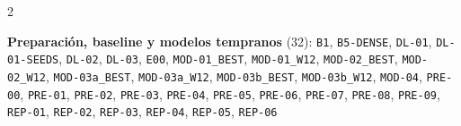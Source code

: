 \begin{multicols}{2}
\raggedright
\scriptsize
\noindent\textbf{Preparación, baseline y modelos tempranos} (32): \texttt{B1}, \texttt{B5-\allowbreak{}DENSE}, \texttt{DL-\allowbreak{}01}, \texttt{DL-\allowbreak{}01-\allowbreak{}SEEDS}, \texttt{DL-\allowbreak{}02}, \texttt{DL-\allowbreak{}03}, \texttt{E00}, \texttt{MOD-\allowbreak{}01\_\allowbreak{}BEST}, \texttt{MOD-\allowbreak{}01\_\allowbreak{}W12}, \texttt{MOD-\allowbreak{}02\_\allowbreak{}BEST}, \texttt{MOD-\allowbreak{}02\_\allowbreak{}W12}, \texttt{MOD-\allowbreak{}03a\_\allowbreak{}BEST}, \texttt{MOD-\allowbreak{}03a\_\allowbreak{}W12}, \texttt{MOD-\allowbreak{}03b\_\allowbreak{}BEST}, \texttt{MOD-\allowbreak{}03b\_\allowbreak{}W12}, \texttt{MOD-\allowbreak{}04}, \texttt{PRE-\allowbreak{}00}, \texttt{PRE-\allowbreak{}01}, \texttt{PRE-\allowbreak{}02}, \texttt{PRE-\allowbreak{}03}, \texttt{PRE-\allowbreak{}04}, \texttt{PRE-\allowbreak{}05}, \texttt{PRE-\allowbreak{}06}, \texttt{PRE-\allowbreak{}07}, \texttt{PRE-\allowbreak{}08}, \texttt{PRE-\allowbreak{}09}, \texttt{REP-\allowbreak{}01}, \texttt{REP-\allowbreak{}02}, \texttt{REP-\allowbreak{}03}, \texttt{REP-\allowbreak{}04}, \texttt{REP-\allowbreak{}05}, \texttt{REP-\allowbreak{}06}\par\smallskip

\end{multicols}
